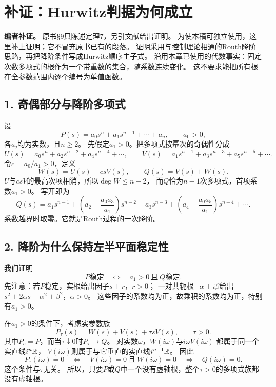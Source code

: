 \section*{补证：Hurwitz判据为何成立}
\label{sec:hurwitz-proof}

\noindent\textbf{编者补证。}
原书§9只陈述定理7，另引文献给出证明。
为使本稿可独立使用，这里补上证明；它不冒充原书已有的段落。
证明采用与控制理论相通的Routh降阶思路，再把降阶条件写成Hurwitz顺序主子式。
沿用本章已使用的代数事实：固定次数多项式的根作为一个带重数的集合，随系数连续变化。
这不要求能把所有根在全参数范围内逐个编号为单值函数。

\subsection*{1. 奇偶部分与降阶多项式}

设
\[
 P(s)=a_0s^n+a_1s^{n-1}+\cdots+a_n,\qquad a_0>0,
\]
各$a_j$均为实数，且$n\ge2$。
先假定$a_1>0$。把多项式按幂次的奇偶性分成
\[
 U(s)=a_0s^n+a_2s^{n-2}+a_4s^{n-4}+\cdots,
 \qquad
 V(s)=a_1s^{n-1}+a_3s^{n-3}+a_5s^{n-5}+\cdots.
\]
令$c=a_0/a_1>0$，定义
\[
 W(s)=U(s)-csV(s),\qquad Q(s)=V(s)+W(s).
\]
$U$与$csV$的最高次项相消，所以$\deg W\le n-2$，
而$Q$恰为$n-1$次多项式，首项系数$a_1>0$。
写开即为
\[
 Q(s)=a_1s^{n-1}
 +\left(a_2-\frac{a_0a_3}{a_1}\right)s^{n-2}
 +a_3s^{n-3}
 +\left(a_4-\frac{a_0a_5}{a_1}\right)s^{n-4}
 +\cdots.
\]
系数越界时取零。它就是Routh过程的一次降阶。

\subsection*{2. 降阶为什么保持左半平面稳定性}

我们证明
\begin{equation}
 P\text{稳定}
 \quad\Longleftrightarrow\quad
 a_1>0\ \text{且}\ Q\text{稳定}.
 \label{eq:routh-reduction}
\end{equation}
先注意：若$P$稳定，实根给出因子$s+r$，$r>0$；
一对共轭根$-\alpha\pm i\beta$给出
$s^2+2\alpha s+\alpha^2+\beta^2$，$\alpha>0$。
这些因子的系数均为正，故乘积的系数均为正，特别有$a_1>0$。

在$a_1>0$的条件下，考虑实参数族
\[
 P_\tau(s)=W(s)+V(s)+\tau sV(s),\qquad \tau>0.
\]
其中$P_c=P$，而当$\tau\downarrow0$时$P_\tau\to Q$。
对实数$\omega$，$W(i\omega)$与$i\omega V(i\omega)$
都属于同一个实直线$i^n\mathbb R$，
$V(i\omega)$则属于与它垂直的实直线$i^{n-1}\mathbb R$。
因此
\[
 P_\tau(i\omega)=0
 \quad\Longleftrightarrow\quad
 V(i\omega)=0\ \text{且}\ W(i\omega)=0
 \quad\Longleftrightarrow\quad Q(i\omega)=0.
\]
这个条件与$\tau$无关。
所以，只要$P$或$Q$中一个没有虚轴根，整个$\tau>0$的多项式族都没有虚轴根。

